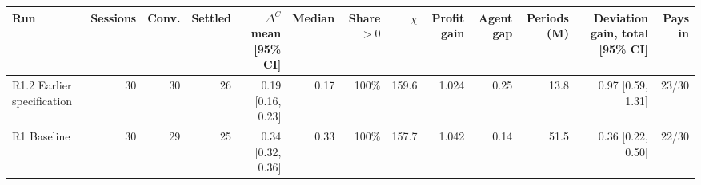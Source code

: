 \begin{tabular}{lrrrrrrrrrrrr}
\toprule
Run & Sessions & Conv. & Settled & $\Delta^C$ mean [95\% CI] & Median & Share $>0$ & $\hat\chi$ & Profit gain & Agent gap & Periods (M) & Deviation gain, total [95\% CI] & Pays in \\
\midrule
R1.2 Earlier specification & 30 & 30 & 26 & 0.19 [0.16, 0.23] & 0.17 & 100\% & 159.6 & 1.024 & 0.25 & 13.8 & 0.97 [0.59, 1.31] & 23/30 \\
R1 Baseline & 30 & 29 & 25 & 0.34 [0.32, 0.36] & 0.33 & 100\% & 157.7 & 1.042 & 0.14 & 51.5 & 0.36 [0.22, 0.50] & 22/30 \\
\bottomrule
\end{tabular}
